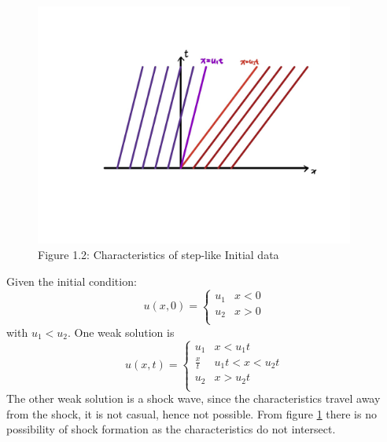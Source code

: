 \documentclass[a4paper,11pt]{article}
\begin{document}
\newpage
\begin{figure}[H]
 \center
 \includegraphics[width = 0.9\linewidth, height =8cm]{Q1(2).jpg}
 \caption{Figure 1.2: Characteristics of step-like Initial data}
 \label{Q1(2)}
\end{figure}
Given the initial condition:
\[
 u(x,0)=\begin{cases}
               u_1 & x < 0\\
               u_2 & x > 0\\
            \end{cases}
\]
with  $u_1<u_2$.
One weak solution is 
\[
 u(x,t)=\begin{cases}
               u_1 & x<u_1 t\\
               \frac{x}{t} & u_1 t<x<u_2 t\\
               u_2 & x>u_2 t\\
            \end{cases}
\]
The other weak solution is a shock wave, since the characteristics travel away from the shock, it is not casual, hence not possible. 
From figure \ref{Q1(2)} there is no possibility of shock formation as the characteristics do not intersect.
\end{document}
